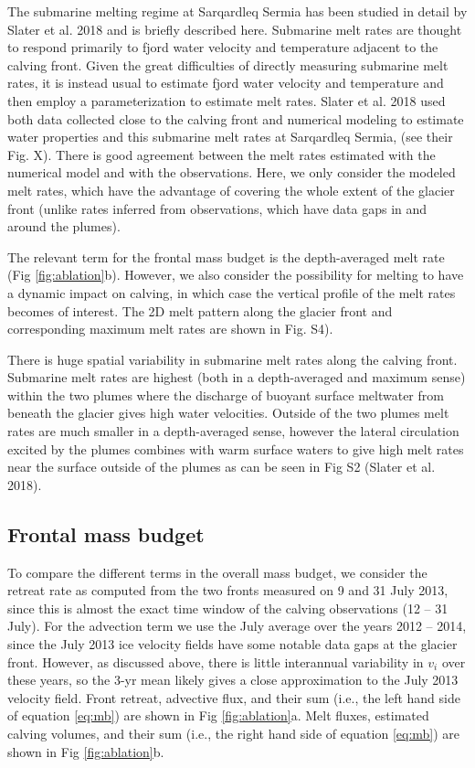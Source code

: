 \documentclass[10pt,letterpaper]{article}
\begin{document}
The submarine melting regime at Sarqardleq Sermia has been studied in detail by Slater et al. 2018 and is briefly described here. Submarine melt rates are thought to respond primarily to fjord water velocity and temperature adjacent to the calving front. Given the great difficulties of directly measuring submarine melt rates, it is instead usual to estimate fjord water velocity and temperature  and then employ a parameterization to estimate melt rates. Slater et al. 2018 used both data collected close to the calving front and numerical modeling to estimate water properties and this submarine melt rates at Sarqardleq Sermia, (see their Fig. X). There is good agreement between the melt rates estimated with the numerical model and with the observations. Here, we only consider the modeled melt rates, which have the advantage of covering the whole extent of the glacier front (unlike rates inferred from observations, which have data gaps in and around the plumes). 

The relevant term for the frontal mass budget is the depth-averaged melt rate (Fig \ref{fig:ablation}b). However, we also consider the possibility for melting to have a dynamic impact on calving, in which case the vertical profile of the melt rates becomes of interest. The 2D melt pattern along the glacier front and corresponding maximum melt rates are shown in Fig. S4). 

There is huge spatial variability in submarine melt rates along the calving front. Submarine melt rates are highest (both in a depth-averaged and maximum sense) within the two plumes where the discharge of buoyant surface meltwater from beneath the glacier gives high water velocities. Outside of the two plumes melt rates are much smaller in a depth-averaged sense, however the lateral circulation excited by the plumes combines with warm surface waters to give high melt rates near the surface outside of the plumes as can be seen in Fig S2 (Slater et al. 2018).

\subsection{Frontal mass budget}

To compare the different terms in the overall mass budget, we consider the retreat rate as computed from the two fronts measured on 9 and 31 July 2013, since this is almost the exact time window of the calving observations (12 -- 31 July).  For the advection term we use the July average over the years 2012 -- 2014, since the July 2013 ice velocity fields have some notable data gaps at the glacier front. However, as discussed above, there is little interannual variability in $v_i$ over these years, so the 3-yr mean likely gives a close approximation to the July 2013 velocity field. Front retreat, advective flux, and their sum (i.e., the left hand side of equation \ref{eq:mb}) are shown in Fig \ref{fig:ablation}a. Melt fluxes, estimated calving volumes, and their sum (i.e., the right hand side of equation \ref{eq:mb}) are shown in Fig \ref{fig:ablation}b. 
\end{document}
